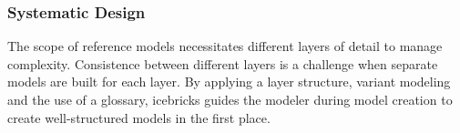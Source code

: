 	 \subsubsection{Systematic Design}
	 The scope of reference models necessitates different layers of detail to manage complexity. Consistence between different layers is a challenge when separate models are built for each layer. By applying a layer structure, variant modeling and the use of a glossary, icebricks guides the modeler during model creation to create well-structured models in the first place. 

	
